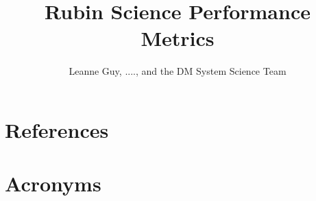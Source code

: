\documentclass[OPS,authoryear,lsstdraft,toc]{lsstdoc}
\title{Rubin Science Performance Metrics}
\author{%
Leanne Guy, ....,  and the DM System Science Team
}
\date{\vcsDate}
\begin{document}
\maketitle





\appendix

% 

\section{References} \label{sec:bib}
\renewcommand{\refname}{} %


\section{Acronyms} \label{sec:acronyms}

\end{document}
